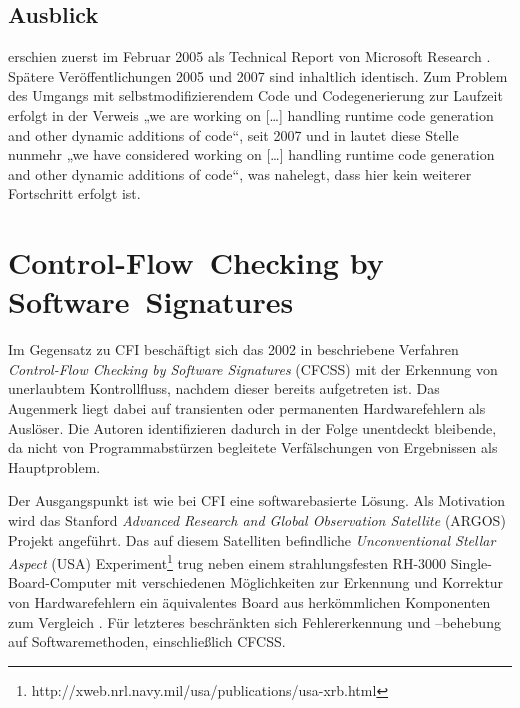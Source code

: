 \documentclass[11pt]{article}
\begin{document}

\subsection{Ausblick}

\cite{abadi-2009-control-tissec} erschien zuerst im Februar 2005 als Technical
Report von Microsoft Research \cite{abadi-2005-control-msr}. Spätere
Veröffentlichungen 2005 und 2007 sind inhaltlich identisch. Zum Problem des
Umgangs mit selbstmodifizierendem Code und Codegenerierung zur Laufzeit erfolgt
in \cite{abadi-2005-control-msr} der Verweis „we are working on […] handling
runtime code generation and other dynamic additions of code“, seit 2007 und in
\cite{abadi-2009-control-tissec} lautet diese Stelle nunmehr „we have
considered working on […] handling runtime code generation and other dynamic
additions of code“, was nahelegt, dass hier kein weiterer Fortschritt erfolgt
ist. %


\section{Control-Flow~Checking by Software~Signatures}


Im Gegensatz zu CFI beschäftigt sich das 2002 in \cite{oh-2002-control}
beschriebene Verfahren \emph{Control-Flow Checking by Software Signatures}
(CFCSS) mit der Erkennung von unerlaubtem Kontrollfluss, nachdem dieser bereits
aufgetreten ist. Das Augenmerk liegt dabei auf transienten oder permanenten
Hardwarefehlern als Auslöser. Die Autoren identifizieren dadurch in der Folge
unentdeckt bleibende, da nicht von Programmabstürzen begleitete Verfälschungen
von Ergebnissen als Hauptproblem.

Der Ausgangspunkt ist wie bei CFI eine softwarebasierte Lösung. Als Motivation
wird das Stanford \emph{Advanced Research and Global Observation Satellite}
(ARGOS) Projekt angeführt. Das auf diesem Satelliten befindliche
\emph{Unconventional Stellar Aspect} (USA)
Experiment\footnote{http://xweb.nrl.navy.mil/usa/publications/usa-xrb.html}
trug neben einem strahlungsfesten RH-3000 Single-Board-Computer mit
verschiedenen Möglichkeiten zur Erkennung und Korrektur von Hardwarefehlern ein
äquivalentes Board aus herkömmlichen Komponenten zum
Vergleich \cite{argos-2002-lessons}. Für letzteres beschränkten sich
Fehlererkennung und –behebung auf Softwaremethoden, einschließlich CFCSS.
\end{document}
